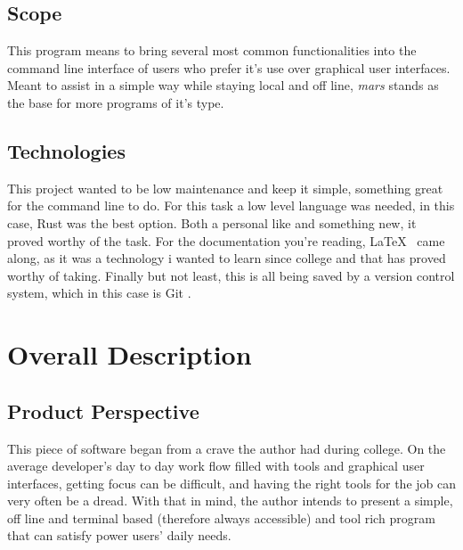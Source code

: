 \documentclass{report}
\begin{document}
\section{Scope}
This program means to bring several most common functionalities into the command line interface of users who prefer it's use over graphical user interfaces. Meant to assist in a simple way while staying local and off line, \emph{mars} stands as the base for more programs of it's type.

\section{Technologies}
This project wanted to be low maintenance and keep it simple, something great for the command line to do. For this task a low level language was needed, in this case, Rust \cite{RustProgrammingLanguage} was the best option. Both a personal like and something new, it proved worthy of the task. For the documentation you're reading, \LaTeX\ \cite{LaTeXDocumentPreparation} came along, as it was a technology i wanted to learn since college and that  has proved worthy of taking. Finally but not least, this is all being saved by a version control system, which in this case is Git \cite{Git}.

\chapter{Overall Description}
\section{Product Perspective}
This piece of software began from a crave the author had during college. On the average developer's day to day work flow filled with tools and graphical user interfaces, getting focus can be difficult, and having the right tools for the job can very often be a dread. With that in mind, the author intends to present a simple, off line and terminal based (therefore always accessible) and tool rich program that can satisfy power users' daily needs.
\end{document}
